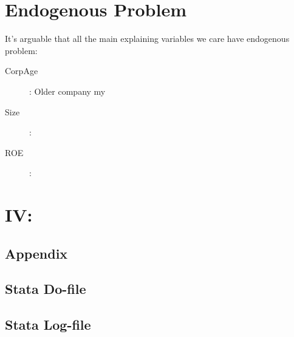 \documentclass{article}
\begin{document}
\newpage
\section{Endogenous Problem}
It's arguable that all the main explaining variables we care have endogenous problem:
\begin{description}
	\item [CorpAge]: Older company my 
	\item [Size]:
	\item [ROE]:
\end{description}
\section{IV: }

\begin{appendix}
\section*{Appendix}
\subsection{Stata Do-file}
\subsection{Stata Log-file}
\end{appendix}
\end{document}
